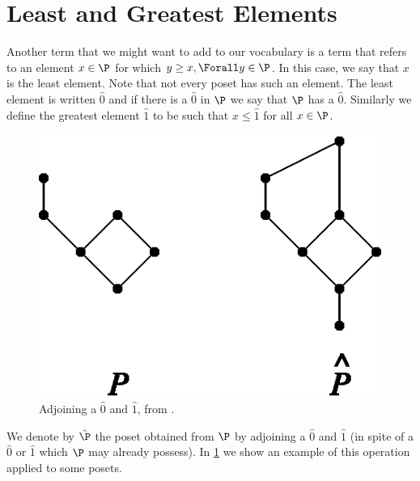 \section{Least and Greatest Elements}
\label{tree:poset:leastandgreatest}

Another term that we might want to add to our vocabulary is a term that refers
to an element $x \in \P$ for which $y \geq x, \Forall y \in \P$. In this case,
we say that $x$ is the least element. Note that not every poset has such an
element. The least element is written $\hat{0}$ and if there is a $\hat{0}$ in
$\P$ we say that $\P$ has a $\hat{0}$. Similarly we define the greatest element
$\hat{1}$ to be such that $x \leq \hat{1}$ for all $x \in \P$.

\begin{figure}
	\centering
	\includegraphics[height=0.2\textheight]{fig/stanley/3-3}
	\caption{\label{fig:stanley:3-3} Adjoining a $\hat{0}$ and $\hat{1}$, from
\citet*{Stanley:2011:ECV:2124415}.}
\end{figure}

We denote by \(\hat{\P}\) the poset obtained from \(\P\) by adjoining a
\(\hat{0}\) and \(\hat{1}\) (in spite of a \(\hat{0}\) or \(\hat{1}\) which
\(\P\) may already possess). In \ref{fig:stanley:3-3} we show an example of
this operation applied to some posets.
